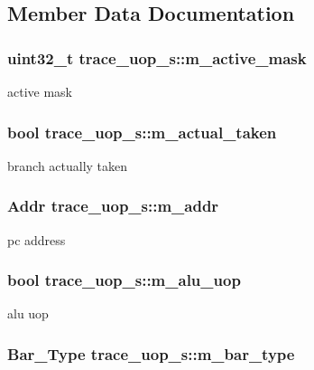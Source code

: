 \subsection{Member Data Documentation}
\hypertarget{structtrace__uop__s_a66eaa2e8bd9fb79f01b9a834e13c2936}{
\subsubsection[{m\_\-active\_\-mask}]{\setlength{\rightskip}{0pt plus 5cm}uint32\_\-t {\bf trace\_\-uop\_\-s::m\_\-active\_\-mask}}}
\label{structtrace__uop__s_a66eaa2e8bd9fb79f01b9a834e13c2936}
active mask \hypertarget{structtrace__uop__s_a3b49bbce85cc478fde2b890513e7998b}{
\subsubsection[{m\_\-actual\_\-taken}]{\setlength{\rightskip}{0pt plus 5cm}bool {\bf trace\_\-uop\_\-s::m\_\-actual\_\-taken}}}
\label{structtrace__uop__s_a3b49bbce85cc478fde2b890513e7998b}
branch actually taken \hypertarget{structtrace__uop__s_a969a71bd1a66780652ccafa1dc8899ad}{
\subsubsection[{m\_\-addr}]{\setlength{\rightskip}{0pt plus 5cm}Addr {\bf trace\_\-uop\_\-s::m\_\-addr}}}
\label{structtrace__uop__s_a969a71bd1a66780652ccafa1dc8899ad}
pc address \hypertarget{structtrace__uop__s_a4d6297f8aeb9fa902d5e32296a5f2d41}{
\subsubsection[{m\_\-alu\_\-uop}]{\setlength{\rightskip}{0pt plus 5cm}bool {\bf trace\_\-uop\_\-s::m\_\-alu\_\-uop}}}
\label{structtrace__uop__s_a4d6297f8aeb9fa902d5e32296a5f2d41}
alu uop \hypertarget{structtrace__uop__s_adb4072e10f06644f837979021c37b4ed}{
\subsubsection[{m\_\-bar\_\-type}]{\setlength{\rightskip}{0pt plus 5cm}Bar\_\-Type {\bf trace\_\-uop\_\-s::m\_\-bar\_\-type}}}

